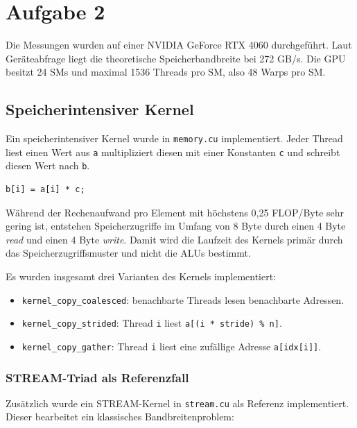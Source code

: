 
\section{Aufgabe 2}

Die Messungen wurden auf einer NVIDIA GeForce RTX 4060 durchgeführt. Laut
Geräteabfrage liegt die theoretische Speicherbandbreite bei
272 GB/s. Die GPU besitzt 24 SMs und maximal 1536 Threads pro SM, also
48 Warps pro SM.

\subsection{Speicherintensiver Kernel}

Ein speicherintensiver Kernel wurde in \texttt{memory.cu} implementiert. Jeder Thread 
liest einen Wert aus \texttt{a} multipliziert diesen mit einer Konstanten \texttt{c}
und schreibt diesen Wert nach \texttt{b}. 

\begin{verbatim}
b[i] = a[i] * c;
\end{verbatim}

Während der Rechenaufwand pro Element mit höchstens 0{,}25 FLOP/Byte sehr gering ist, 
entstehen Speicherzugriffe im Umfang von 8 Byte durch einen 4 Byte \textit{read} und 
einen 4 Byte \textit{write}. Damit wird die Laufzeit des Kernels primär durch das 
Speicherzugriffsmuster und nicht die ALUs bestimmt.


Es wurden insgesamt drei Varianten des Kernels implementiert:

\begin{itemize}
  \item \texttt{kernel\_copy\_coalesced}: benachbarte Threads lesen
        benachbarte Adressen.
  \item \texttt{kernel\_copy\_strided}: Thread \texttt{i} liest
        \texttt{a[(i * stride) \% n]}.
  \item \texttt{kernel\_copy\_gather}: Thread \texttt{i} liest eine
        zufällige Adresse \texttt{a[idx[i]]}.
\end{itemize}

\subsubsection{STREAM-Triad als Referenzfall}

Zusätzlich wurde ein STREAM-Kernel in \texttt{stream.cu} als Referenz implementiert. 
Dieser bearbeitet ein klassisches Bandbreitenproblem:

